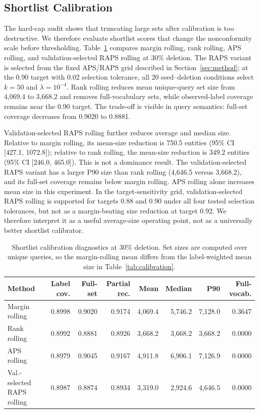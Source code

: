 \documentclass[information,article,submit,oneauthor,pdftex]{Definitions/mdpi}
\begin{document}
\subsection{Shortlist Calibration}

The hard-cap audit shows that truncating large sets after calibration is too
destructive. We therefore evaluate shortlist scores that change the
nonconformity scale before thresholding. Table~\ref{tab:shortlist} compares
margin rolling, rank rolling, APS rolling, and validation-selected RAPS rolling
at 30\% deletion. The RAPS variant is selected from the fixed APS/RAPS grid
described in Section~\ref{sec:method}; at the 0.90 target with 0.02 selection
tolerance, all 20 seed--deletion conditions select \(k=50\) and
\(\lambda=10^{-4}\). Rank rolling reduces mean unique-query set size from
4,069.4 to 3,668.2 and removes full-vocabulary sets, while observed-label
coverage remains near the 0.90 target. The trade-off is visible in query
semantics: full-set coverage decreases from 0.9020 to 0.8881.

Validation-selected RAPS rolling further reduces average and median size.
Relative to margin rolling, its mean-size reduction is 750.5 entities (95\% CI
[427.1, 1072.8]); relative to rank rolling, the mean-size reduction is 349.2
entities (95\% CI [246.0, 465.0]). This is not a dominance result. The
validation-selected RAPS variant has a larger P90 size than rank rolling
(4,646.5 versus 3,668.2), and its full-set coverage remains below margin
rolling. APS rolling alone increases mean size in this experiment. In the
target-sensitivity grid, validation-selected RAPS rolling is supported for
targets 0.88 and 0.90 under all four tested selection tolerances, but not as a
margin-beating size reduction at target 0.92. We therefore interpret it as a
useful average-size operating point, not as a universally better shortlist
calibrator.

\begin{table}[t]
\centering
\caption{Shortlist calibration diagnostics at 30\% deletion. Set sizes are
computed over unique queries, so the margin-rolling mean differs from the
label-weighted mean size in Table~\ref{tab:calibration}.}
\label{tab:shortlist}
\scriptsize
\setlength{\tabcolsep}{2pt}
\begin{tabular}{lrrrrrrr}
\toprule
Method & Label cov. & Full-set & Partial rec. & Mean & Median & P90 & Full-vocab.\\
\midrule
Margin rolling & 0.8998 & 0.9020 & 0.9174 & 4,069.4 & 5,746.2 & 7,128.0 & 0.3647\\
Rank rolling & 0.8992 & 0.8881 & 0.8926 & 3,668.2 & 3,668.2 & 3,668.2 & 0.0000\\
APS rolling & 0.8979 & 0.9045 & 0.9167 & 4,911.8 & 6,906.1 & 7,126.9 & 0.0000\\
Val.-selected RAPS rolling & 0.8987 & 0.8874 & 0.8934 & 3,319.0 & 2,924.6 & 4,646.5 & 0.0000\\
\bottomrule
\end{tabular}
\end{table}
\end{document}
